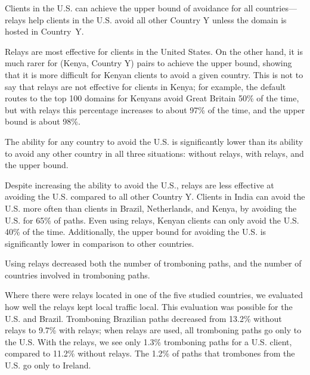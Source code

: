\begin{finding}
Clients in the U.S. can achieve the upper bound of avoidance for all
countries---relays help clients in
the U.S. avoid all other Country Y unless the domain is hosted in Country~Y.  
\end{finding}
\noindent
Relays are most effective for clients in the United States.  On the other hand, it is much rarer for (Kenya, Country Y) pairs to achieve the upper bound, showing that it is more difficult for Kenyan clients to avoid a given country.  This is not to say that relays are not effective for clients in Kenya; for example, the default routes to the top 100 domains for Kenyans avoid Great Britain 50\% of the time, but with relays this percentage increases to about 97\% of the time, and the upper bound is about 98\%. 

\begin{finding}
The ability for any country to avoid the U.S. is significantly lower than its ability to avoid any other country in all three situations: without relays, with relays, and the upper bound. 
\end{finding}
\noindent
Despite increasing the ability to avoid the U.S., relays are less
effective at avoiding the U.S. compared to all other Country Y.
Clients in India can avoid the U.S. more often than clients in Brazil,
Netherlands, and Kenya, by avoiding the U.S. for 65\% of paths.  Even
using relays, Kenyan clients can only avoid the U.S. 40\% of the time.  Additionally, the upper bound for avoiding the U.S. is significantly lower in comparison to other countries.  

\begin{finding}
Using relays decreased both the number of tromboning paths, and the
number of countries involved in tromboning paths.
\end{finding}
\noindent
Where there were relays located in one of the five
studied countries, we evaluated how well the relays kept local
traffic local.  This evaluation was possible for the U.S. and Brazil.
Tromboning Brazilian paths decreased from 13.2\% without relays to
9.7\% with relays; when relays are used, all tromboning paths go only
to the U.S.  With the relays, we see only 1.3\% tromboning paths for a
U.S. client, compared to 11.2\% without relays.  The 1.2\% of
paths that trombones from the U.S. go only to Ireland.

